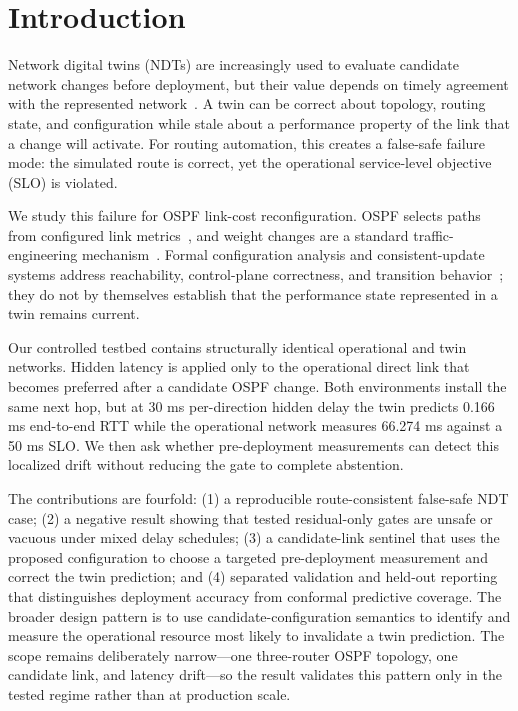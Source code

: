 \section{Introduction}

Network digital twins (NDTs) are increasingly used to evaluate candidate network changes before deployment, but their value depends on timely agreement with the represented network~\cite{zhou2026ndtarch,zhou2026datacollection}. A twin can be correct about topology, routing state, and configuration while stale about a performance property of the link that a change will activate. For routing automation, this creates a false-safe failure mode: the simulated route is correct, yet the operational service-level objective (SLO) is violated.

We study this failure for OSPF link-cost reconfiguration. OSPF selects paths from configured link metrics~\cite{moy1998ospf}, and weight changes are a standard traffic-engineering mechanism~\cite{fortz2000ospf}. Formal configuration analysis and consistent-update systems address reachability, control-plane correctness, and transition behavior~\cite{fogel2015analysis,beckett2017verification,prabhu2020plankton,reitblatt2012updates}; they do not by themselves establish that the performance state represented in a twin remains current.

Our controlled testbed contains structurally identical operational and twin networks. Hidden latency is applied only to the operational direct link that becomes preferred after a candidate OSPF change. Both environments install the same next hop, but at 30 ms per-direction hidden delay the twin predicts 0.166 ms end-to-end RTT while the operational network measures 66.274 ms against a 50 ms SLO. We then ask whether pre-deployment measurements can detect this localized drift without reducing the gate to complete abstention.

The contributions are fourfold: (1) a reproducible route-consistent false-safe NDT case; (2) a negative result showing that tested residual-only gates are unsafe or vacuous under mixed delay schedules; (3) a candidate-link sentinel that uses the proposed configuration to choose a targeted pre-deployment measurement and correct the twin prediction; and (4) separated validation and held-out reporting that distinguishes deployment accuracy from conformal predictive coverage. The broader design pattern is to use candidate-configuration semantics to identify and measure the operational resource most likely to invalidate a twin prediction. The scope remains deliberately narrow---one three-router OSPF topology, one candidate link, and latency drift---so the result validates this pattern only in the tested regime rather than at production scale.
